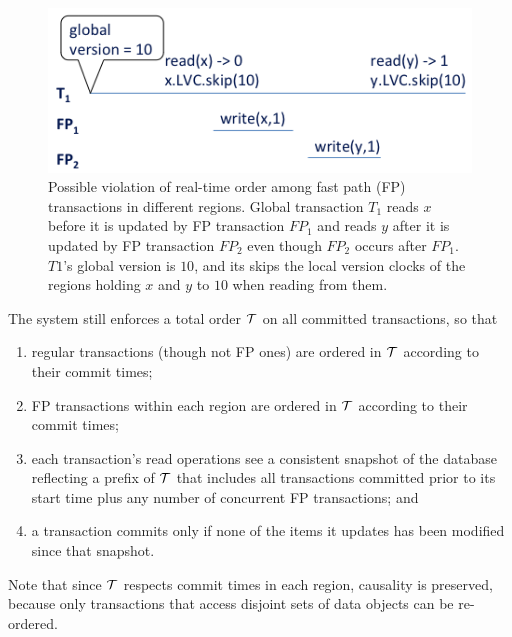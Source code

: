 \begin{figure}[h]
\includegraphics[width=\columnwidth]{LTX-RT}
\caption{Possible violation of real-time order among fast path (FP) transactions in different regions. Global transaction $T_1$
reads $x$ before it is updated by FP transaction $FP_1$ and reads $y$ after it is updated by FP transaction $FP_2$ even 
though $FP_2$ occurs after $FP_1$. $T1$'s global version is $10$, and its skips the local version clocks of the regions holding $x$ and $y$ to $10$ when reading from them.}
\label{fig:ltx-rt}
\end{figure}

The system still enforces a total order ${\cal T}$ on all committed transactions, so that
\begin{enumerate}
    \setlength{\itemsep}{0pt}
    \setlength{\parskip}{0pt}
    \setlength{\parsep}{2pt}  
\item
regular transactions (though not FP ones) are ordered in ${\cal T}$  according to their commit times;
\item
FP transactions within each region are ordered in ${\cal T}$  according to their commit times;
\item
each transaction's read operations see a consistent snapshot of the database reflecting 
a prefix of  ${\cal T}$ that includes all transactions committed prior to
its start time plus any number of concurrent FP transactions; and 
\item
 a transaction commits only if none of the items it updates has been modified since that snapshot.
 \end{enumerate}

Note that since ${\cal T}$  respects commit times in each region, causality is preserved, because 
only transactions that  access disjoint  sets of data objects can be re-ordered.


